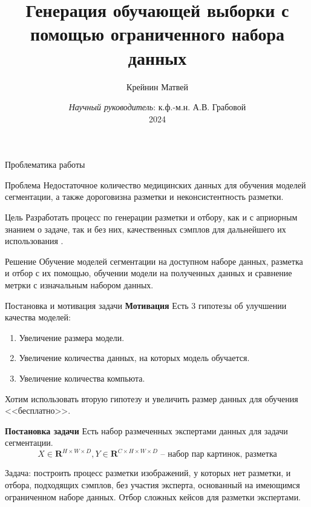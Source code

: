 \documentclass[10pt]{beamer}
\title{Генерация обучающей выборки с помощью ограниченного набора данных}
\author{Крейнин Матвей}
\institute[MIPT]{Московский физико-технический институт \\ Кафедра интеллектуальных систем}
\date[2024]{\textit{Научный руководитель}: к.ф.-м.н. А.В. Грабовой \\ 2024}
\theoremstyle{definition}
\begin{document}
	
	\begin{frame}[c]
		\titlepage
	\end{frame}
	
	\begin{frame}{Проблематика работы}
		
		\begin{alertblock}{Проблема}
			Недостаточное количество медицинских данных для обучения моделей сегментации, а также дороговизна разметки и неконсистентность разметки.
		\end{alertblock}
		
		\begin{block}{Цель}
			Разработать процесс по генерации разметки и отбору, как и с априорным знанием о задаче, так и без них, качественных сэмплов для дальнейшего их использования .
		\end{block}
		
		\begin{exampleblock}{Решение}
		  Обучение моделей сегментации на доступном наборе данных, разметка и отбор с их помощью, обучении модели на полученных данных и сравнение метрки с изначальным набором данных.
		\end{exampleblock}
		
	\end{frame}	
	
	\begin{frame}{Постановка и мотивация задачи}
	       \textbf{Мотивация}
           Есть 3 гипотезы об улучшении качества моделей: 
           \begin{enumerate}
               \item Увеличение размера модели.
               \item Увеличение количества данных, на которых модель обучается.
               \item Увеличение количества компьюта.
           \end{enumerate}

           Хотим использовать вторую гипотезу и увеличить размер данных для обучения <<бесплатно>>.
            
            \textbf{Постановка задачи}	
        Есть набор размеченных экспертами данных для задачи сегментации.
            $$
            X \in \mathbf{R}^{H \times W \times D}, Y \in \mathbf{R}^{C \times H \times W \times D} \text{ -- набор пар картинок, разметка}
            $$
            
            Задача: построить процесс разметки изображений, у которых нет разметки, и отбора, подходящих сэмплов, без участия эксперта, основанный на имеющимся ограниченном наборе данных. Отбор сложных кейсов для разметки экспертами.
		
	\end{frame}	
        
\end{document}
